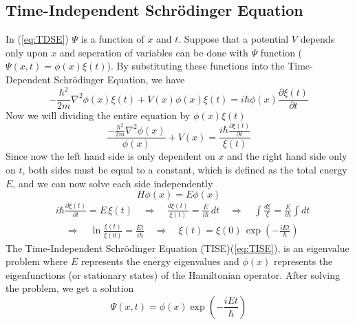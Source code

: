 \documentclass[11pt]{article}
\begin{document}
\subsection{Time-Independent Schrödinger Equation}
In (\ref{eq:TDSE}) $\Psi$ is a function of $x$ and $t$. Suppose that a potential $V$ depends only upon $x$ and seperation of variables can be done with $\Psi$ function ($\Psi(x,t) = \phi(x) \xi(t)$). By substituting these functions into the Time-Dependent Schrödinger Equation, we have
\begin{equation}
	- \frac{\hbar^2}{2m} \nabla^2 \phi(x) \xi(t) + V(x) \phi(x) \xi(t) = i \hbar \phi(x) \frac{\partial \xi(t)}{\partial t}
\end{equation}
Now we will dividing the entire equation by $\phi(x) \xi(t)$
\begin{equation}
	\frac{- \frac{\hbar^2}{2m} \nabla^2 \phi(x)}{\phi(x)} + V(x)  = \frac{i \hbar \frac{\partial \xi(t)}{\partial t}}{\xi(t)}
\end{equation}
Since now the left hand side is only dependent on $x$ and the right hand side only on $t$, both sides must be equal to a constant, which is defined as the total energy$E$, and we can now solve each side independently
\begin{equation}\label{eq:TISE}
	H \phi(x) = E \phi(x)
\end{equation}
\begin{equation}
	\begin{aligned}
	& i \hbar \frac{\partial \xi(t)}{\partial t} = E \, \xi(t) 
	\quad \Rightarrow \quad \frac{d \xi(t)}{\xi(t)} = \frac{E}{i \hbar} \, dt 
	\quad \Rightarrow \quad \int \frac{d \xi}{\xi} = \frac{E}{i \hbar} \int dt \\
	& \quad \Rightarrow \quad \ln \frac{\xi(t)}{\xi(0)} = \frac{E t}{i \hbar} 
	\quad \Rightarrow \quad \xi(t) = \xi(0)\, \exp\!\left(-\frac{iEt}{\hbar}\right)
\end{aligned}
\end{equation}
The Time-Independent Schrödinger Equation (TISE)(\ref{eq:TISE}), is an eigenvalue problem where $E$ represents the energy eigenvalues and $\phi(x)$ represents the eigenfunctions (or stationary states) of the Hamiltonian operator. After solving the problem, we get a solution
\begin{equation}
	\Psi(x,t) = \phi(x) \exp\!\left(-\frac{iEt}{\hbar}\right)
\end{equation}
\end{document}
